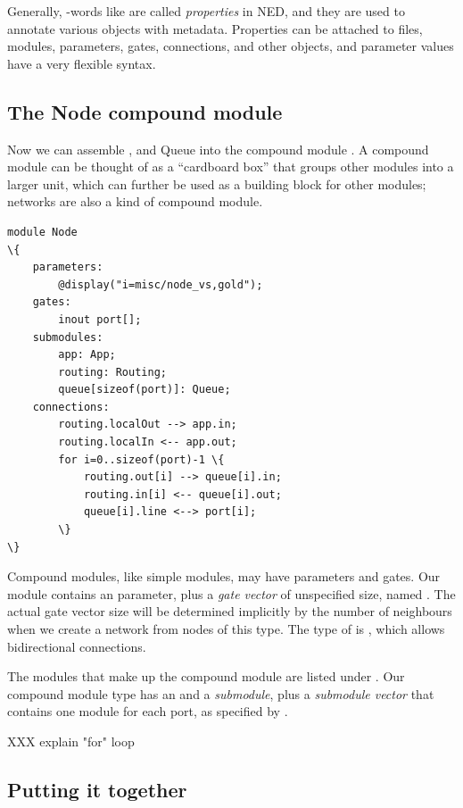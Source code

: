 Generally, -words like  are called \textit{properties}
in NED, and they are used to annotate various objects
with metadata. Properties can be attached to files, modules, parameters, gates,
connections, and other objects, and parameter values have a very flexible
syntax.


\subsection{The Node compound module}

Now we can assemble ,  and {Queue} into the
compound module . A compound module can be thought of as
a ``cardboard box'' that groups other modules into a larger unit,
which can further be used as a building block for other modules;
networks are also a kind of compound module.

\begin{Verbatim}[commandchars=\\\{\}]
module Node
\{
    parameters:
        @display("i=misc/node_vs,gold");
    gates:
        inout port[];
    submodules:
        app: App;
        routing: Routing;
        queue[sizeof(port)]: Queue;
    connections:
        routing.localOut --> app.in;
        routing.localIn <-- app.out;
        for i=0..sizeof(port)-1 \{
            routing.out[i] --> queue[i].in;
            routing.in[i] <-- queue[i].out;
            queue[i].line <--> port[i];
        \}
\}
\end{Verbatim}

Compound modules, like simple modules, may have parameters and gates.
Our  module contains an  parameter, plus a
\textit{gate vector} of unspecified size, named .
The actual gate vector size will be determined implicitly by the number
of neighbours when we create a network from nodes of this type.
The type of  is , which allows bidirectional
connections.

The modules that make up the compound module are listed under .
Our  compound module type has an  and a 
\textit{submodule}, plus a  \textit{submodule vector} that
contains one  module for each port, as specified by
.

XXX explain "for" loop

\subsection{Putting it together}

